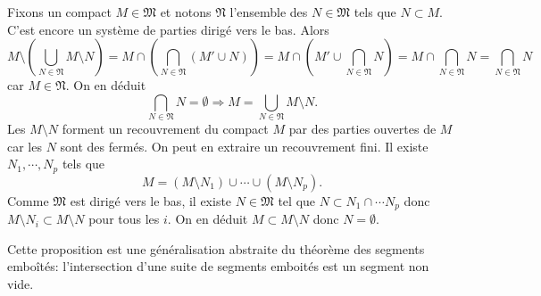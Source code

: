 \begin{demo}
Fixons un compact $M\in \mathfrak{M}$ et notons $\mathfrak{N}$ l'ensemble des $N\in \mathfrak{M}$ tels que $N \subset M$. C'est encore un système de parties dirigé vers le bas. Alors
\begin{displaymath}
 M \setminus \left( \bigcup_{N \in \mathfrak{N}} M\setminus N\right)
 =  M \cap \left( \bigcap_{N \in \mathfrak{N}} (M' \cup N)\right)
 =  M \cap \left( M' \cup \bigcap_{N \in \mathfrak{N}}  N\right)
 =  M \cap  \bigcap_{N \in \mathfrak{N}}N
 = \bigcap_{N \in \mathfrak{N}}N
\end{displaymath}
car $M \in \mathfrak{N}$. On en déduit
\begin{displaymath}
 \bigcap_{N \in \mathfrak{N}}N = \emptyset \Rightarrow M = \bigcup_{N \in \mathfrak{N}} M\setminus N.
\end{displaymath}
Les $M\setminus N$ forment un recouvrement du compact $M$ par des parties ouvertes de $M$ car les $N$ sont des fermés. On peut en extraire un recouvrement fini. Il existe $N_1, \cdots, N_p$ tels que
\begin{displaymath}
 M = (M\setminus N_1) \cup \cdots \cup (M\setminus N_p).
\end{displaymath}
Comme $\mathfrak{M}$ est dirigé vers le bas, il existe $N \in \mathfrak{M}$ tel que $N \subset N_1 \cap \cdots N_p$ donc $M \setminus N_i \subset M \setminus N$ pour tous les $i$. On en déduit $M \subset M \setminus N$ donc $N = \emptyset$.
\end{demo}
Cette proposition est une généralisation abstraite du théorème des segments emboîtés: l'intersection d'une suite de segments emboités est un segment non vide.

